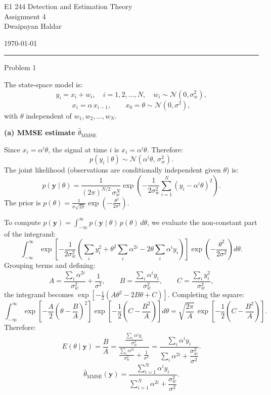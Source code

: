 \documentclass[12pt,a4paper,onecolumn]{exam}
\newcommand{\questionheader}[1]{%
  \begin{tcolorbox}[
    enhanced,
    colback=black,
    coltext=white,
    boxrule=0pt,
    fontupper=\Large\bfseries,
    arc=4mm
  ]
  #1
  \end{tcolorbox}%
}
\begin{document}
\begingroup
    \centering
    \LARGE E1 244 Detection and Estimation Theory\\
    \LARGE Assignment 4\\[0.5em]
    \large Dwaipayan Haldar\par
    \large \today\\[0.5em]
\endgroup
\noindent\rule{\textwidth}{0.5pt}
\printanswers
\renewcommand{\solutiontitle}{\noindent\textbf{Ans:}\enspace}

\questionheader{Problem 1}

\begin{solution}

The state-space model is:
\[
  y_i = x_i + w_i, \quad i = 1, 2, \ldots, N, \quad w_i \sim \mathcal{N}(0,\sigma_w^2),
\]
\[
  x_i = \alpha\, x_{i-1}, \qquad x_0 = \theta \sim \mathcal{N}(0,\sigma^2),
\]
with $\theta$ independent of $w_1, w_2, \ldots, w_N$.

\textbf{(a) MMSE estimate $\hat{\theta}_{\mathrm{MMSE}}$}

Since $x_i = \alpha^i \theta$, the signal at time $i$ is $x_i = \alpha^i\theta$. Therefore:
\[
  p(y_i \mid \theta) \sim \mathcal{N}(\alpha^i\theta,\, \sigma_w^2).
\]
The joint likelihood (observations are conditionally independent given $\theta$) is:
\[
  p(\mathbf{y} \mid \theta) = \frac{1}{(2\pi)^{N/2}\,\sigma_w^N}
    \exp\!\left(-\frac{1}{2\sigma_w^2}\sum_{i=1}^N (y_i - \alpha^i\theta)^2\right).
\]
The prior is $p(\theta) = \frac{1}{\sigma\sqrt{2\pi}}\exp\!\left(-\frac{\theta^2}{2\sigma^2}\right)$.

To compute $p(\mathbf{y}) = \int_{-\infty}^{\infty} p(\mathbf{y}\mid\theta)\,p(\theta)\,d\theta$, we evaluate the non-constant part of the integrand:
\[
  \int_{-\infty}^{\infty}
    \exp\!\left[-\frac{1}{2\sigma_w^2}\!\left(\sum_i y_i^2 + \theta^2\sum_i\alpha^{2i}
      - 2\theta\sum_i \alpha^i y_i\right)\right]
    \exp\!\left(-\frac{\theta^2}{2\sigma^2}\right) d\theta.
\]
Grouping terms and defining:
\[
  A = \frac{\sum_i \alpha^{2i}}{\sigma_w^2} + \frac{1}{\sigma^2}, \qquad
  B = \frac{\sum_i \alpha^i y_i}{\sigma_w^2}, \qquad
  C = \frac{\sum_i y_i^2}{\sigma_w^2},
\]
the integrand becomes $\exp\!\left[-\tfrac{1}{2}(A\theta^2 - 2B\theta + C)\right]$. Completing the square:
\[
  \int_{-\infty}^{\infty}
    \exp\!\left[-\frac{A}{2}\!\left(\theta - \frac{B}{A}\right)^2\right]
    \exp\!\left[-\frac{1}{2}\!\left(C - \frac{B^2}{A}\right)\right] d\theta
  = \sqrt{\frac{2\pi}{A}}\,\exp\!\left[-\frac{1}{2}\!\left(C - \frac{B^2}{A}\right)\right].
\]
Therefore:
\[
  E(\theta \mid \mathbf{y}) = \frac{B}{A}
    = \frac{\displaystyle\frac{\sum_i \alpha^i y_i}{\sigma_w^2}}{\displaystyle\frac{\sum_i \alpha^{2i}}{\sigma_w^2} + \frac{1}{\sigma^2}}
    = \frac{\sum_i \alpha^i y_i}{\sum_i \alpha^{2i} + \dfrac{\sigma_w^2}{\sigma^2}}.
\]
\[
  \boxed{\hat{\theta}_{\mathrm{MMSE}}(\mathbf{y}) = \frac{\sum_{i=1}^N \alpha^i y_i}{\sum_{i=1}^N \alpha^{2i} + \dfrac{\sigma_w^2}{\sigma^2}}.}
\]


\end{solution}
\end{document}
